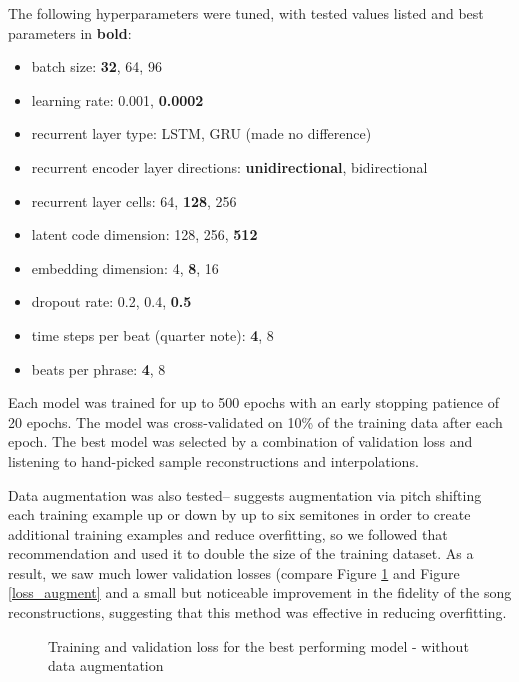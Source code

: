 \documentclass[sigconf,authorversion]{acmart}
\providecommand{\tightlist}{%
  \setlength{\itemsep}{0pt}\setlength{\parskip}{0pt}}
\begin{document}
The following hyperparameters were tuned, with tested values listed
and best parameters in \textbf{bold}:

\begin{itemize}
  \tightlist
  \item batch size: \textbf{32}, 64, 96
  \item learning rate: 0.001, \textbf{0.0002}
  \item recurrent layer type: LSTM, GRU (made no difference)
  \item recurrent encoder layer directions: \textbf{unidirectional}, bidirectional
  \item recurrent layer cells: 64, \textbf{128}, 256
  \item latent code dimension: 128, 256, \textbf{512}
  \item embedding dimension: 4, \textbf{8}, 16
  \item dropout rate: 0.2, 0.4, \textbf{0.5}
  \item time steps per beat (quarter note): \textbf{4}, 8
  \item beats per phrase: \textbf{4}, 8
\end{itemize}

Each model was trained for up to 500 epochs with an early stopping
patience of 20 epochs. The model was cross-validated on 10\% of the
training data after each epoch. The best model was selected by a
combination of validation loss and listening to hand-picked sample
reconstructions and interpolations.

Data augmentation was also tested--\cite{oore_this_2018} suggests
augmentation via pitch shifting each training example up or down by up
to six semitones in order to create additional training examples and
reduce overfitting, so we followed that recommendation and used it to
double the size of the training dataset. As a result, we saw much
lower validation losses (compare Figure \ref{loss} and Figure
\ref{loss_augment} and a small but noticeable improvement in the
fidelity of the song reconstructions, suggesting that this method was
effective in reducing overfitting.

\begin{figure}[htbp]
    \begin{center}
        \scalebox{0.5}{}
    \end{center}
    \caption{Training and validation loss for the best performing model - without data augmentation}
    \label{loss}
\end{figure}
\end{document}
